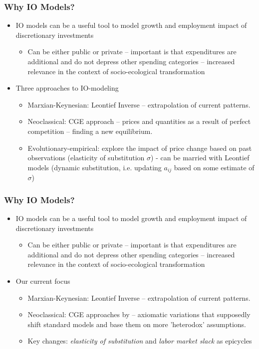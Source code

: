 \documentclass[utf8,aspectratio=169,ngerman,english]{beamer}
\begin{document}
\begin{frame}
\frametitle{Why IO Models?}

\begin{itemize}
  \item IO models can be a useful tool to model growth and employment impact of discretionary investments
  \begin{itemize}
      \item Can be either public or private – important is that expenditures are additional and do not depress other spending categories – increased relevance in the context of socio-ecological transformation
  \end{itemize}
  
  \item Three approaches to IO-modeling
 \begin{itemize}
      \item Marxian-Keynesian: Leontief Inverse – extrapolation of current patterns.
      \item Neoclassical: CGE approach – prices and quantities as a result of perfect competition – finding a new equilibrium.
      \item Evolutionary-empirical: explore the impact of price change based on past observations (elasticity of substitution $\sigma$) - can be married with Leontief models (dynamic substitution, i.e. updating $a_{ij}$ based on some estimate of $\sigma$)
    \end{itemize}
\end{itemize}
\end{frame}

\begin{frame}
\frametitle{Why IO Models?}

\begin{itemize}
  \item IO models can be a useful tool to model growth and employment impact of discretionary investments
  \begin{itemize}
      \item Can be either public or private – important is that expenditures are additional and do not depress other spending categories – increased relevance in the context of socio-ecological transformation
  \end{itemize}
  
  \item Our current focus
 \begin{itemize}
      \item Marxian-Keynesian: Leontief Inverse – extrapolation of current patterns.
      \item Neoclassical: CGE approaches by \cite{baqaeeMacroeconomicImpactMicroeconomic2019,baqaeeSupplyDemandDisaggregated2022} – axiomatic variations \parencite{kapellerModelPlatonismEconomicsClassical2013} that supposedly shift standard models and base them on more 'heterodox' assumptions.
      \item Key changes: \textit{elasticity of substitution} and \textit{labor market slack} as epicycles
    \end{itemize}
\end{itemize}
\end{frame}
\end{document}
